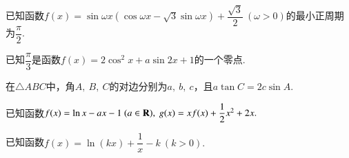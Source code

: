\documentclass{BHCexam}
\begin{document}
\begin{questions}
\kongbai
\qs 已知函数$f(x)=\sin \omega x(\cos \omega x-\sqrt{3}\sin \omega x)+\dfrac{\sqrt{3}}{2}~(\omega >0)$的最小正周期为$ \dfrac{\pi}{2}. $
\kongbai 
\qs 已知$ \dfrac{\pi}{3} $是函数$f(x)=2\cos^2x+a\sin2x+1$的一个零点.
\kongbai
\qs 在$\triangle ABC$中，角$ A,~B,~C $的对边分别为$ a,~b,~c $，且$ a\tan C=2c\sin A $.
\kongbai
\qs 已知函数$f(x)=\ln x-ax-1 ~(a\in\mathbf{R}),~g(x)=xf(x)+\dfrac{1}{2}x^2+2x.$
\kongbai
\qs 已知函数$f(x)=\ln(kx)+\dfrac{1}{x}-k~(k>0).$
\begin{parts}

\end{parts}
\end{questions}
\end{document}
